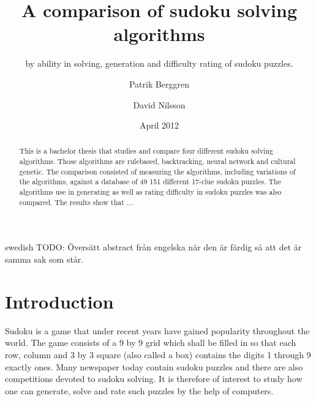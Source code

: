 \documentclass[a4paper,11pt]{kth-mag}
\title{A comparison of sudoku solving algorithms}
\subtitle{by ability in solving, generation and difficulty rating of sudoku puzzles.}
\author{Patrik Berggren}
\author{David Nilsson}
\date{April 2012}
\begin{document}
\frontmatter
\pagestyle{empty}
\removepagenumbers
\maketitle
{}
\begin{abstract}
This is a bachelor thesis that studies and compare four different sudoku
solving algorithms. Those algorithms are rulebased, backtracking, neural network and 
cultural genetic.  The comparison consisted of measuring the algorithms, including
variations of the algorithms, against a database of 49 151 different 17-clue sudoku
puzzles. The algorithms use in generating as well as rating difficulty in sudoku
puzzles was also compared. The results show that ...
\end{abstract}
\clearpage
\begin{foreignabstract}{swedish}
TODO: Översätt abstract från engelska när den är färdig så att det är samma sak som står.
\end{foreignabstract}
\clearpage
\tableofcontents*
\mainmatter
\pagestyle{newchap}
\chapter{Introduction}
Sudoku is a game that under recent years have gained popularity throughout the world. 
The game consists of a 9 by 9 grid which shall be filled in so that each 
row, column and 3 by 3 square (also called a box) contains the digits 
1 through 9 exactly ones. 
Many newspaper today contain sudoku puzzles and there are also competitions devoted 
to sudoku solving. It is therefore of interest to study how one can generate, 
solve and rate such puzzles by the help of computers.
\end{document}
